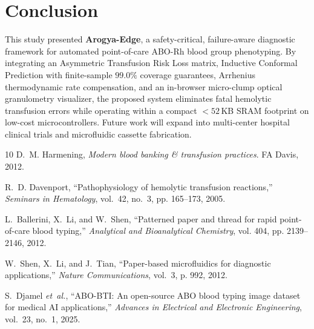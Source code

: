 \documentclass[11pt,a4paper]{article}
\begin{document}
\section{Conclusion}
This study presented \textbf{Arogya-Edge}, a safety-critical, failure-aware diagnostic framework for automated point-of-care ABO-Rh blood group phenotyping. By integrating an Asymmetric Transfusion Risk Loss matrix, Inductive Conformal Prediction with finite-sample $99.0\%$ coverage guarantees, Arrhenius thermodynamic rate compensation, and an in-browser micro-clump optical granulometry visualizer, the proposed system eliminates fatal hemolytic transfusion errors while operating within a compact $<52$\,KB SRAM footprint on low-cost microcontrollers. Future work will expand into multi-center hospital clinical trials and microfluidic cassette fabrication.

\begin{thebibliography}{10}
D.~M. Harmening, \emph{Modern blood banking \& transfusion practices}. FA Davis, 2012.

R.~D. Davenport, ``Pathophysiology of hemolytic transfusion reactions,'' \emph{Seminars in Hematology}, vol.~42, no.~3, pp. 165--173, 2005.

L.~Ballerini, X.~Li, and W.~Shen, ``Patterned paper and thread for rapid point-of-care blood typing,'' \emph{Analytical and Bioanalytical Chemistry}, vol. 404, pp. 2139--2146, 2012.

W.~Shen, X.~Li, and J.~Tian, ``Paper-based microfluidics for diagnostic applications,'' \emph{Nature Communications}, vol.~3, p. 992, 2012.

S.~Djamel \emph{et~al.}, ``ABO-BTI: An open-source ABO blood typing image dataset for medical AI applications,'' \emph{Advances in Electrical and Electronic Engineering}, vol.~23, no.~1, 2025.
\end{thebibliography}
\end{document}
